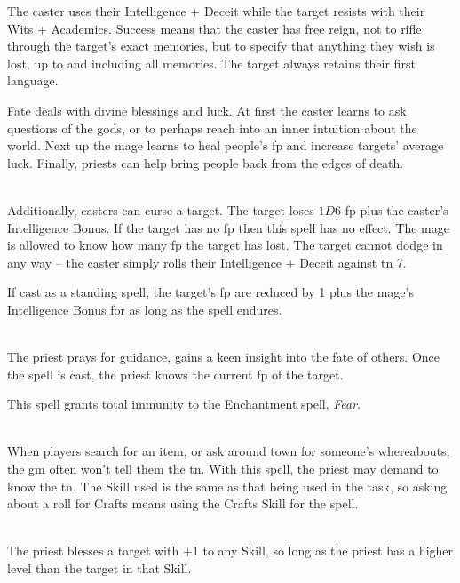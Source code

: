 \begin{multicols}{2}
The caster uses their Intelligence + Deceit while the target resists with their Wits + Academics.
Success means that the caster has free reign, not to rifle through the target's exact memories, but to specify that anything they wish is lost, up to and including all memories.
The target always retains their first language.

\end{multicols}

Fate deals with divine blessings and luck. At first the caster learns to ask questions of the gods, or to perhaps reach into an inner intuition about the world. Next up the mage learns to heal people's \gls{fp} and increase targets' average luck. Finally, priests can help bring people back from the edges of death.

\begin{multicols}{2}

\spelllevel

\\
Additionally, casters can curse a target. The target loses $1D6$ \gls{fp} plus the caster's Intelligence Bonus. If the target has no \gls{fp} then this spell has no effect. The mage is allowed to know how many \gls{fp} the target has lost. The target cannot dodge in any way -- the caster simply rolls their Intelligence + Deceit against \gls{tn} 7.

If cast as a standing spell, the target's \gls{fp} are reduced by 1 plus the mage's Intelligence Bonus for as long as the spell endures.

\\
The priest prays for guidance, gains a keen insight into the fate of others.
Once the spell is cast, the priest knows the current \gls{fp} of the target.

This spell grants total immunity to the Enchantment spell, \textit{Fear}.

\\
When players search for an item, or ask around town for someone's whereabouts, the \gls{gm} often won't tell them the \gls{tn}.  With this spell, the priest may demand to know the \gls{tn}.  The Skill used is the same as that being used in the task, so asking about a roll for Crafts means using the Crafts Skill for the spell.

\\
The priest blesses a target with +1 to any Skill, so long as the priest has a higher level than the target in that Skill.


\end{multicols}
